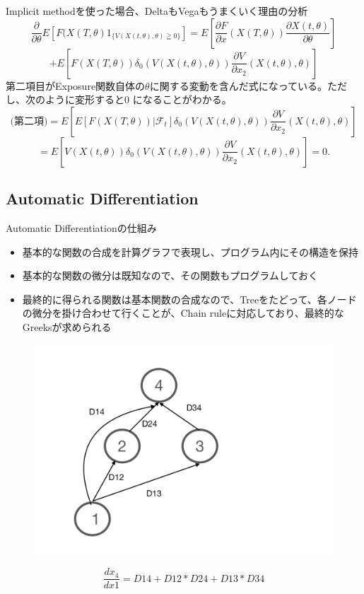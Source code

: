 \documentclass[driverfallback=dvipdfmx,cjk]{beamer}
\begin{document}
\begin{frame}
    Implicit methodを使った場合、DeltaもVegaもうまくいく理由の分析
    $$ \frac{\partial}{\partial \theta} E[F(X(T, \theta ) 1_{\{  V\left(X(t, \theta), \theta\right) \geqq 0\}}  ] = E[ \frac{\partial F}{\partial x}(X(T, \theta))
    \frac{\partial X(t, \theta)}{\partial \theta} ]$$
    $$+ E[ F(X(T, \theta ))\delta_0(V\left( X(t, \theta), \theta \right)) \frac{\partial V}{\partial x_2} \left(X(t, \theta) , \theta \right) ]$$
    第二項目がExposure関数自体の$\theta$に関する変動を含んだ式になっている。ただし、次のように変形すると$0$ になることがわかる。
    $$ \text{(第二項)} = E[ E[ F(X(T, \theta )) | \mathcal{F}_t] \delta_0(V\left( X(t, \theta), \theta \right)) \frac{\partial V}{\partial x_2} \left(X(t, \theta) , \theta \right) ]$$
    $$= E[ V(X(t, \theta ))\delta_0(V\left( X(t, \theta), \theta \right)) \frac{\partial V}{\partial x_2} \left(X(t, \theta) , \theta \right) ]=0.$$
\end{frame}

\subsection{Automatic Differentiation}
\begin{frame}
    Automatic Differentiationの仕組み
    \begin{itemize}
        \item 基本的な関数の合成を計算グラフで表現し、プログラム内にその構造を保持
        \item 基本的な関数の微分は既知なので、その関数もプログラムしておく
        \item 最終的に得られる関数は基本関数の合成なので、Treeをたどって、各ノードの微分を掛け合わせて行くことが、Chain ruleに対応しており、最終的なGreeksが求められる
    \end{itemize}
\end{frame}

\begin{frame}
    \begin{figure}
    \includegraphics[scale=0.4]{AADImage.pdf}
    \end{figure}
    $$ \frac{d x_4}{d x1} = D14 + D12 * D24 + D13 * D34$$
\end{frame}
\end{document}
